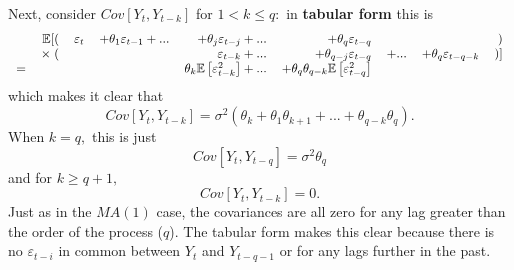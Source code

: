 \documentclass[openany]{tufte-book} %
\begin{document}
Next, consider $Cov\left[ Y_{t},Y_{t-k}\right] $ for $1<k\leq
q:$ in \textbf{tabular form} this is
\begin{equation*}
\begin{tabular}{rrrrrrrrr}
& $\mathbb{E}[($ & $\varepsilon_{t}$ & $+\theta_{1}\varepsilon_{t-1}+...$ & $%
+\theta_{j}\varepsilon_{t-j}+...$ & $+\theta_{q}\varepsilon_{t-q}$ &  &
& $)$ \\
& $\times \;($ &  &  & $\varepsilon_{t-k}+...$ & $+\theta_{q-j}\varepsilon_{t-q}$ & $+...$ & $+\theta_{q}\varepsilon_{t-q-k}$ & $)]$ \\
$=$ &  &  &  & $\theta_{k}\mathbb{E}\left[ \varepsilon_{t-k}^{2}\right] +...$ & $%
+\theta_{q}\theta_{q-k}\mathbb{E}\left[ \varepsilon_{t-q}^{2}\right] $ &  &  &
\end{tabular}
\end{equation*}
which makes it clear that
\begin{equation*}
Cov\left[ Y_{t},Y_{t-k}\right] =\sigma^{2}\left( \theta_{k}+\theta_{1}\theta_{k+1}+...+\theta_{q-k}\theta_{q}\right) .
\end{equation*}
When $k=q,$ this is just
\begin{equation*}Cov\left[ Y_{t},Y_{t-q}\right] =\sigma^{2}\theta_{q}
\end{equation*}
and for $k\geq q+1,$%
\begin{equation*}
Cov\left[ Y_{t},Y_{t-k}\right] =0.
\end{equation*}
Just as in the $MA\left( 1\right) $ case, the covariances are all zero for
any lag greater than the order of the process ($q$). The tabular form makes
this clear because there is no $\varepsilon _{t-i}$ in common between $Y_{t}$
and $Y_{t-q-1}$ or for any lags further in the past.
\end{document}

